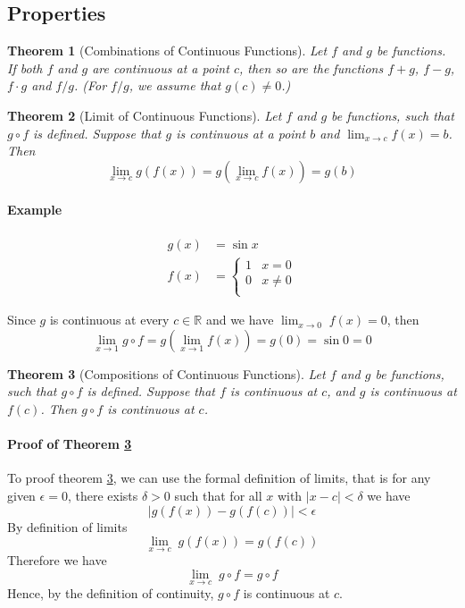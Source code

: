 \documentclass[12pt]{article}
\newtheorem{theorem}{Theorem}
\begin{document}
\subsection{Properties}
\begin{theorem}[Combinations of Continuous Functions]
    Let $f$ and $g$ be functions. If both $f$ and $g$ are continuous at a
    point $c$, then so are the functions $f + g$, $f - g$, $f \cdot g$ and $f / g$. (For
    $f / g$, we assume that $g(c) \neq 0$.)
\end{theorem}
\begin{theorem}[Limit of Continuous Functions]
    Let $f$ and $g$ be functions, such that $g \circ f$ is defined. Suppose that
    $g$ is continuous at a point $b$ and $\lim_{x \to c} f(x) = b$. Then
    \[
        \lim_{x \to c} g(f(x)) = g(\lim_{x \to c} f(x)) = g(b)
    \]
\end{theorem}
\paragraph{Example} 
\begin{align*} 
    g(x) &= \sin x \\
    f(x) &=
    \begin{cases}
        1 & x = 0 \\
        0 & x \neq 0 \\
    \end{cases}
\end{align*}

Since $g$ is continuous at every $c \in \mathbb{R}$ and we have $\lim_{x \to 0} \; f(x) = 0$, then
\[
    \lim_{x \to 1 } g \circ f = g(\lim_{x \to 1} f(x)) = g(0) = \sin 0 = 0
\]
\begin{theorem}[Compositions of Continuous Functions]
    \label{composition continuous}
    Let $f$ and $g$ be functions, such that $g \circ f$ is defined. Suppose that
    $f$ is continuous at $c$, and $g$ is continuous at $f(c)$. Then $g \circ f$ is
    continuous at $c$.
\end{theorem}

\paragraph{Proof of Theorem \ref{composition continuous}} To proof theorem \ref{composition continuous}, we can use the formal definition of limits, that is
for any given $\epsilon = 0$, there exists $\delta > 0$ such that for all $x$ with $|x - c| < \delta$ we have
\[
    |g(f(x)) - g(f(c)) | < \epsilon
\]
By definition of limits
\[
    \lim_{x \to c} \; g(f(x)) = g(f(c))
\] 
Therefore we have
\[
    \lim_{x \to c} \; g \circ f = g \circ f
\]
Hence, by the definition of continuity, $g \circ f$ is continuous at $c$.
\end{document}
